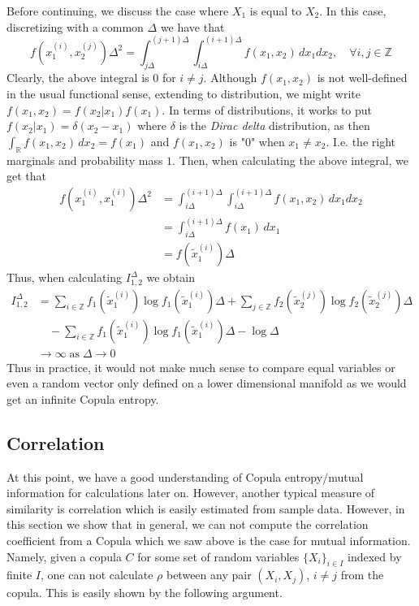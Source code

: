 \documentclass[../Thesis.tex]{subfiles}
\begin{document}
Before continuing, we discuss the case where $X_1$ is equal to $X_2$. In this case, discretizing with a common $\Delta$ we have that
$$f\left(x_1^{(i)}, x_2^{(j)}\right)\Delta^2 = \int_{j\Delta}^{(j+1)\Delta}\int_{i\Delta}^{(i+1)\Delta} f(x_1,x_2) \, dx_1 dx_2,\quad \forall i,j\in\mathbb{Z}$$
Clearly, the above integral is $0$ for $i\neq j$. Although $f(x_1,x_2)$ is not well-defined in the usual functional sense, extending to distribution, we might write $f(x_1,x_2) = f(x_2 | x_1) f(x_1)$. In terms of distributions, it works to put $f(x_2 | x_1) = \delta(x_2 - x_1)$ where $\delta$ is the \textit{Dirac delta} distribution, as then $\int_{\mathbb{R}} f(x_1,x_2) \, dx_2 = f(x_1)$ and $f(x_1, x_2)$ is "$0$" when $x_1 \neq x_2$. I.e. the right marginals and probability mass $1$. Then, when calculating the above integral, we get that
\begin{align*}
    f\left(x_1^{(i)}, x_1^{(i)}\right)\Delta^2 & = \int_{i\Delta}^{(i+1)\Delta}\int_{i\Delta}^{(i+1)\Delta} f(x_1,x_2) \, dx_1 dx_2 \\
                                               & = \int_{i\Delta}^{(i+1)\Delta} f\left(x_1\right)\, dx_1                            \\
                                               & = f\left(\tilde{x}_1^{(i)}\right)\Delta
\end{align*}
Thus, when calculating $I^{\Delta}_{1,2}$ we obtain
\begin{align*}
    I^{\Delta}_{1,2} & = \sum_{i\in\mathbb{Z}} f_1\left(\tilde{x}_1^{(i)}\right) \log{f_1\left(\tilde{x}_1^{(i)}\right)}\Delta + \sum_{j\in\mathbb{Z}} f_2\left(\tilde{x}_2^{(j)}\right)  \log{f_2\left(\tilde{x}_2^{(j)}\right)}\Delta \\
                     & \quad - \sum_{i\in\mathbb{Z}} f_1\left(\tilde{x}_1^{(i)}\right) \log{f_1\left(\tilde{x}_1^{(i)}\right)}\Delta - \log \Delta                                                                                      \\
                     & \to \infty \;\text{as}\; \Delta \to 0
\end{align*}
Thus in practice, it would not make much sense to compare equal variables or even a random vector only defined on a lower dimensional manifold as we would get an infinite Copula entropy.





\subsection{Correlation}
At this point, we have a good understanding of Copula entropy/mutual information for calculations later on. However, another typical measure of similarity is correlation which is easily estimated from sample data. However, in this section we show that in general, we can not compute the correlation coefficient from a Copula which we saw above is the case for mutual information. Namely, given a copula $C$ for some set of random variables $\{X_i\}_{i\in I}$ indexed by finite $I$, one can not calculate $\rho$ between any pair $(X_i ,X_j)$, $i\neq j$ from the copula. This is easily shown by the following argument.
\end{document}

